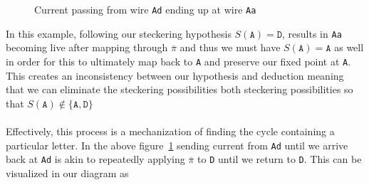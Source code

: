 \begin{figure}[H]
\begin{minipage}{0.45\textwidth}
  \end{minipage}
  \caption{Current passing from wire \texttt{Ad} ending up at wire \texttt{Aa}}
  \label{fig:incorrect_stecker}
\end{figure}
\noindent In this example, following our steckering hypothesis
$S(\texttt{A}) = \texttt{D}$,
results in \texttt{Aa} becoming live after mapping through $\overline\pi$ and
thus we must have $S(\texttt{A}) = \texttt{A}$ as well in order for
this to ultimately
map back to \texttt{A} and preserve our fixed point at \texttt{A}.
This creates an inconsistency between our hypothesis and deduction
meaning that we can eliminate the steckering possibilities both
steckering possibilities so that $S(\texttt{A}) \notin \{\texttt{A},
\texttt{D}\}$
\\\\Effectively, this process is a mechanization of
finding the cycle containing a particular letter. In the above
figure~\ref{fig:incorrect_stecker} sending current from \texttt{Ad}
until we arrive back at \texttt{Ad} is
akin to repeatedly applying $\overline\pi$ to \texttt{D}
until we return to \texttt{D}. This can be visualized in our diagram as

